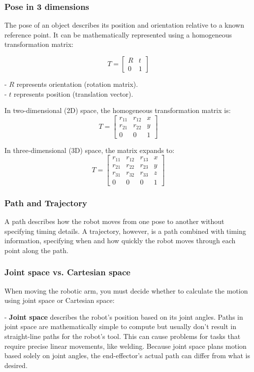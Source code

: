 \documentclass[a4paper,12pt]{article}
\begin{document}
\subsubsection{Pose in 3 dimensions}
The pose of an object describes its position and orientation relative to a known reference point. It can be mathematically represented using a homogeneous transformation matrix:

\[
T = 
\begin{bmatrix}
R & t \\
0 & 1
\end{bmatrix}
\]

- \( R \) represents orientation (rotation matrix).
\\
- \( t \) represents position (translation vector).

In two-dimensional (2D) space, the homogeneous transformation matrix is:
\[
T =
\begin{bmatrix}
r_{11} & r_{12} & x \\
r_{21} & r_{22} & y \\
0 & 0 & 1
\end{bmatrix}
\]

In three-dimensional (3D) space, the matrix expands to:
\[
T = 
\begin{bmatrix}
r_{11} & r_{12} & r_{13} & x \\
r_{21} & r_{22} & r_{23} & y \\
r_{31} & r_{32} & r_{33} & z \\
0 & 0 & 0 & 1
\end{bmatrix}
\]

\subsubsection{Path and Trajectory}
A path describes how the robot moves from one pose to another without specifying timing details. A trajectory, however, is a path combined with timing information, specifying when and how quickly the robot moves through each point along the path.

\subsubsection{Joint space vs. Cartesian space}
When moving the robotic arm, you must decide whether to calculate the motion using joint space or Cartesian space:

- \textbf{Joint space} describes the robot's position based on its joint angles. Paths in joint space are mathematically simple to compute but usually don't result in straight-line paths for the robot's tool. This can cause problems for tasks that require precise linear movements, like welding. Because joint space plans motion based solely on joint angles, the end-effector's actual path can differ from what is desired.
\end{document}
